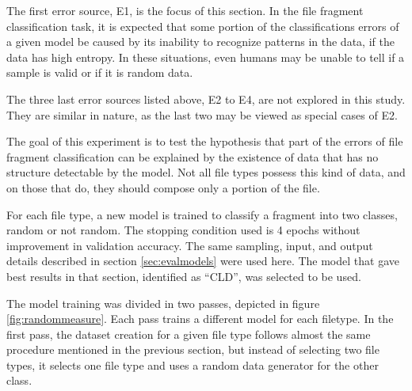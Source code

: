 The first error source, E1, is the focus of this section. In the file fragment classification task, it is expected that some portion of the classifications errors of a given model be caused by its inability to recognize patterns in the data, if the data has high entropy. In these situations, even humans may be unable to tell if a sample is valid or if it is random data.

The three last error sources listed above, E2 to E4, are not explored in this study. They are similar in nature, as the last two may be viewed as special cases of E2. 

The goal of this experiment is to test the hypothesis that part of the errors of file fragment classification  can be explained by the existence of data that has no structure detectable by the model. Not all file types possess this kind of data, and on those that do, they should compose only a portion of the file.


For each file type, a new model is trained to classify a fragment into two classes, random or not random. The stopping condition used is 4 epochs without improvement in validation accuracy.
The same sampling, input, and output details described in section \ref{sec:evalmodels} were used here. The model that gave best results in that section, identified as ``CLD'', was selected to be used.


The model training was divided in two passes, depicted in figure \ref{fig:randommeasure}. Each pass trains a different model for each filetype. In the first pass, the dataset creation for a given file type follows almost the same procedure mentioned in the previous section, but instead of selecting two file types, it selects one file type and uses a random data generator for the other class.

